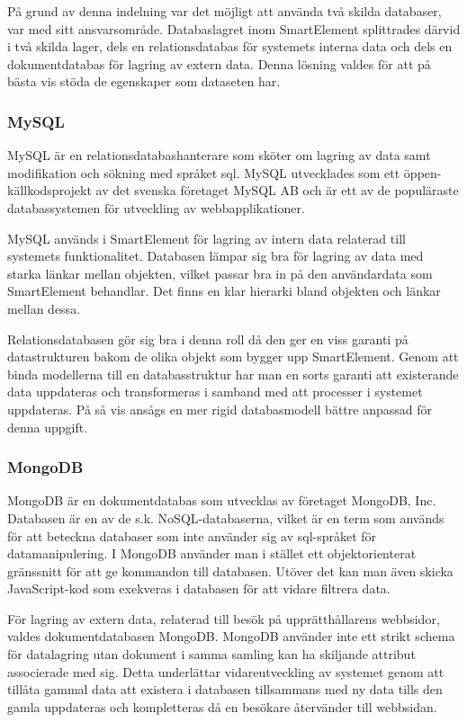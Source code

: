 På grund av denna indelning var det möjligt att använda två skilda databaser, var med sitt ansvarsområde. Databaslagret inom SmartElement splittrades därvid i två skilda lager, dels en relationsdatabas för systemets interna data och dels en dokumentdatabas för lagring av extern data. Denna lösning valdes för att på bästa vis stöda de egenskaper som dataseten har.

\subsubsection{MySQL}

MySQL är en relationsdatabashanterare som sköter om lagring av data samt modifikation och sökning med språket \gls{sql}. MySQL utvecklades som ett öppen-källkodsprojekt av det svenska företaget MySQL AB och är ett av de populäraste databassystemen för utveckling av webbapplikationer. \citep{dbengines}

MySQL används i SmartElement för lagring av intern data relaterad till systemets funktionalitet. Databasen lämpar sig bra för lagring av data med starka länkar mellan objekten, vilket passar bra in på den användardata som SmartElement behandlar. Det finns en klar hierarki bland objekten och länkar mellan dessa.

Relationsdatabasen gör sig bra i denna roll då den ger en viss garanti på datastrukturen bakom de olika objekt som bygger upp SmartElement. Genom att binda modellerna till en databasstruktur har man en sorts garanti att existerande data uppdateras och transformeras i samband med att processer i systemet uppdateras. På så vis ansågs en mer rigid databasmodell bättre anpassad för denna uppgift.

\subsubsection{MongoDB}

MongoDB är en dokumentdatabas som utvecklas av företaget MongoDB, Inc. Databasen är en av de s.k. NoSQL-databaserna, vilket är en term som används för att beteckna databaser som inte använder sig av \gls{sql}-språket för datamanipulering. I MongoDB använder man i stället ett objektorienterat gränssnitt för att ge kommandon till databasen. Utöver det kan man även skicka JavaScript-kod som exekveras i databasen för att vidare filtrera data. \citep{mongoquery}

För lagring av extern data, relaterad till besök på upprätthållarens webbsidor, valdes dokumentdatabasen MongoDB. MongoDB använder inte ett strikt schema för datalagring utan dokument i samma samling kan ha skiljande attribut associerade med sig. Detta underlättar vidareutveckling av systemet genom att tillåta gammal data att existera i databasen tillsammans med ny data tills den gamla uppdateras och kompletteras då en besökare återvänder till webbsidan.

